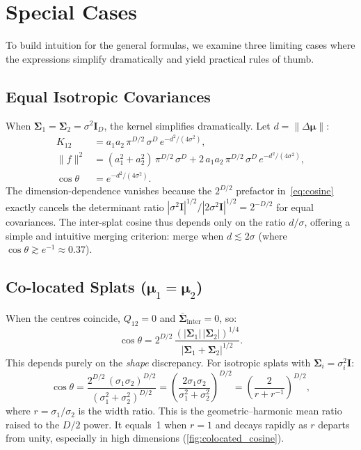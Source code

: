 \documentclass[11pt, a4paper]{article}
\theoremstyle{plain}
\theoremstyle{definition}
\theoremstyle{remark}
\newcommand{\bmu}{\bm{\mu}}
\newcommand{\Sig}{\bm{\Sigma}}
\newcommand{\Sigbar}{\bar{\bm{\Sigma}}}
\begin{document}
\section{Special Cases}\label{sec:special}

To build intuition for the general formulas, we examine three
limiting cases where the expressions simplify dramatically and yield
practical rules of thumb.

\subsection{Equal Isotropic Covariances}
\label{ssec:iso}

When $\Sig_1 = \Sig_2 = \sigma^2\bm{I}_D$, the kernel simplifies
dramatically.  Let $d = \|\Delta\bmu\|$:
\begin{align}
  K_{12} &= a_1 a_2\,\pi^{D/2}\,\sigma^D\,
    e^{-d^2/(4\sigma^2)}, \label{eq:K12_iso}\\
  \|f\|^2 &= (a_1^2 + a_2^2)\,\pi^{D/2}\,\sigma^D
    + 2\,a_1 a_2\,\pi^{D/2}\,\sigma^D\,e^{-d^2/(4\sigma^2)},
    \label{eq:f_norm_iso}\\
  \cos\theta &= e^{-d^2/(4\sigma^2)}.
    \label{eq:cos_iso}
\end{align}
The dimension-dependence vanishes because the $2^{D/2}$ prefactor
in~\eqref{eq:cosine} exactly cancels the determinant ratio
$|\sigma^2\bm{I}|^{1/2}/|2\sigma^2\bm{I}|^{1/2} = 2^{-D/2}$
for equal covariances.
The inter-splat cosine thus depends only on the ratio $d/\sigma$,
offering a simple and intuitive merging criterion: merge when
$d \lesssim 2\sigma$ (where $\cos\theta \gtrsim e^{-1} \approx 0.37$).

\subsection{Co-located Splats (\texorpdfstring{$\bmu_1 = \bmu_2$}{mu1 = mu2})}
\label{ssec:colocated}

When the centres coincide, $Q_{12} = 0$ and
$\Sigbar_{\mathrm{inter}} = 0$, so:
\begin{equation}
  \cos\theta = 2^{D/2}\,
  \frac{(|\Sig_1|\,|\Sig_2|)^{1/4}}{|\Sig_1 + \Sig_2|^{1/2}}.
\end{equation}
This depends purely on the \emph{shape} discrepancy.  For isotropic
splats with $\Sig_i = \sigma_i^2\bm{I}$:
\begin{equation}
  \cos\theta = \frac{2^{D/2}\,(\sigma_1\sigma_2)^{D/2}}
    {(\sigma_1^2 + \sigma_2^2)^{D/2}}
  = \left(\frac{2\sigma_1\sigma_2}{\sigma_1^2 + \sigma_2^2}\right)^{D/2}
  = \left(\frac{2}{r + r^{-1}}\right)^{D/2},
\end{equation}
where $r = \sigma_1/\sigma_2$ is the width ratio.  This is the
geometric--harmonic mean ratio raised to the $D/2$ power.  It equals~1
when $r=1$ and decays rapidly as $r$ departs from unity, especially in
high dimensions (\cref{fig:colocated_cosine}).
\end{document}
